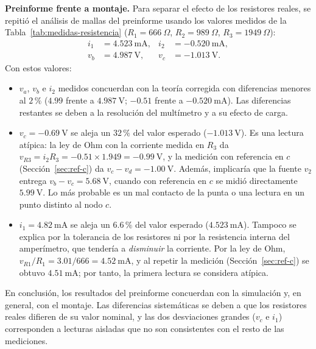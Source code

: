 \documentclass[conference,10pt]{IEEEtran}
\begin{document}
\textbf{Preinforme frente a montaje.} Para separar el efecto de los resistores reales, se repitió el análisis de mallas del preinforme usando los valores medidos de la Tabla~\ref{tab:medidas-resistencia} ($R_1=666~\Omega$, $R_2=989~\Omega$, $R_3=1949~\Omega$):
\begin{align*}
  i_1 &= 4.523~\mathrm{mA}, & i_2 &= -0.520~\mathrm{mA},\\
  v_b &= 4.987~\mathrm{V}, & v_c &= -1.013~\mathrm{V}.
\end{align*}
Con estos valores:
\begin{itemize}
  \item $v_a$, $v_b$ e $i_2$ medidos concuerdan con la teoría corregida con diferencias menores al $2\,\%$ ($4.99$ frente a $4.987~\mathrm{V}$; $-0.51$ frente a $-0.520~\mathrm{mA}$). Las diferencias restantes se deben a la resolución del multímetro y a su efecto de carga.
  \item $v_c=-0.69~\mathrm{V}$ se aleja un $32\,\%$ del valor esperado ($-1.013~\mathrm{V}$). Es una lectura atípica: la ley de Ohm con la corriente medida en $R_3$ da $v_{R3}=i_2R_3=-0.51\times1.949=-0.99~\mathrm{V}$, y la medición con referencia en $c$ (Sección~\ref{sec:ref-c}) da $v_c-v_d=-1.00~\mathrm{V}$. Además, implicaría que la fuente $v_2$ entrega $v_b-v_c=5.68~\mathrm{V}$, cuando con referencia en $c$ se midió directamente $5.99~\mathrm{V}$. Lo más probable es un mal contacto de la punta o una lectura en un punto distinto al nodo $c$.
  \item $i_1=4.82~\mathrm{mA}$ se aleja un $6.6\,\%$ del valor esperado ($4.523~\mathrm{mA}$). Tampoco se explica por la tolerancia de los resistores ni por la resistencia interna del amperímetro, que tendería a \emph{disminuir} la corriente. Por la ley de Ohm, $v_{R1}/R_1=3.01/666=4.52~\mathrm{mA}$, y al repetir la medición (Sección~\ref{sec:ref-c}) se obtuvo $4.51~\mathrm{mA}$; por tanto, la primera lectura se considera atípica.
\end{itemize}

En conclusión, los resultados del preinforme concuerdan con la simulación y, en general, con el montaje. Las diferencias sistemáticas se deben a que los resistores reales difieren de su valor nominal, y las dos desviaciones grandes ($v_c$ e $i_1$) corresponden a lecturas aisladas que no son consistentes con el resto de las mediciones.
\end{document}
